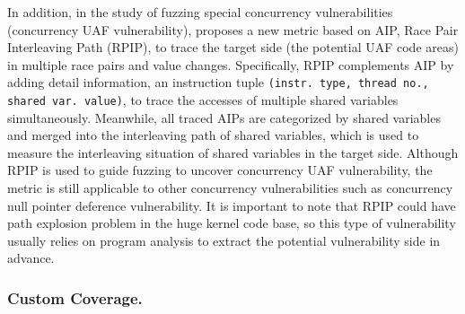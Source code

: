 In addition, in the study of fuzzing special concurrency vulnerabilities (\eg concurrency UAF vulnerability), \cite{Yuan2023DDRace} proposes a new metric based on AIP, Race Pair Interleaving Path (RPIP), to trace the target side (\ie the potential UAF code areas) in multiple race pairs and value changes. Specifically, RPIP complements AIP by adding detail information, \ie an instruction tuple \texttt{(instr. type, thread no., shared var. value)}, to trace the accesses of multiple shared variables simultaneously. Meanwhile, all traced AIPs are categorized by shared variables and merged into the interleaving path of shared variables, which is used to measure the interleaving situation of shared variables in the target side. Although RPIP is used to guide fuzzing to uncover concurrency UAF vulnerability, the metric is still applicable to other concurrency vulnerabilities such as concurrency null pointer deference vulnerability. It is important to note that RPIP could have path explosion problem in the huge kernel code base, so this type of vulnerability usually relies on program analysis to extract the potential vulnerability side in advance.


\subsubsection{Custom Coverage.}

